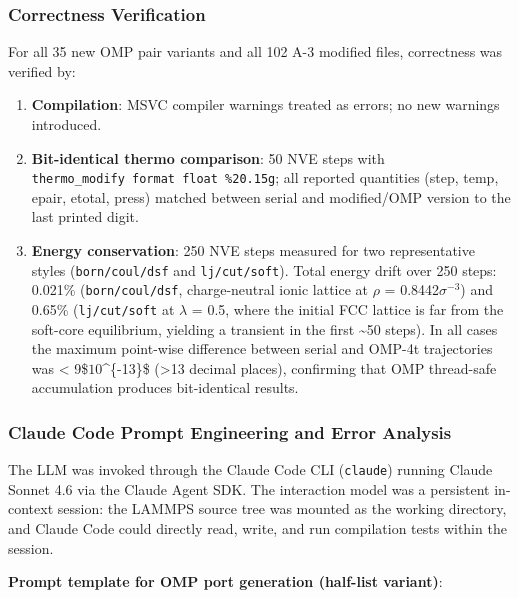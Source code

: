 \documentclass[
  11pt,
]{article}
\providecommand{\tightlist}{%
  \setlength{\itemsep}{0pt}\setlength{\parskip}{0pt}}
\begin{document}
\subsubsection{Correctness Verification}\label{correctness-verification}

For all 35 new OMP pair variants and all 102 A-3 modified files,
correctness was verified by:

\begin{enumerate}
\def\labelenumi{\arabic{enumi}.}
\tightlist
\item
  \textbf{Compilation}: MSVC compiler warnings treated as errors; no new
  warnings introduced.
\item
  \textbf{Bit-identical thermo comparison}: 50 NVE steps with
  \texttt{thermo\_modify\ format\ float\ \%20.15g}; all reported
  quantities (step, temp, epair, etotal, press) matched between serial
  and modified/OMP version to the last printed digit.
\item
  \textbf{Energy conservation}: 250 NVE steps measured for two
  representative styles (\texttt{born/coul/dsf} and
  \texttt{lj/cut/soft}). Total energy drift over 250 steps: 0.021\%
  (\texttt{born/coul/dsf}, charge-neutral ionic lattice at \(\rho\) =
  0.8442\(\sigma\)\(^{-3}\)) and 0.65\% (\texttt{lj/cut/soft} at
  \(\lambda\) = 0.5, where the initial FCC lattice is far from the
  soft-core equilibrium, yielding a transient in the first
  \textasciitilde50 steps). In all cases the maximum point-wise
  difference between serial and OMP-4t trajectories was \textless{}
  9\$\times\(10\)\^{}\{-13\}\$ (\textgreater13 decimal places),
  confirming that OMP thread-safe accumulation produces bit-identical
  results.
\end{enumerate}

\subsubsection{Claude Code Prompt Engineering and Error
Analysis}\label{claude-code-prompt-engineering-and-error-analysis}

The LLM was invoked through the Claude Code CLI (\texttt{claude})
running Claude Sonnet 4.6 via the Claude Agent SDK. The interaction
model was a persistent in-context session: the LAMMPS source tree was
mounted as the working directory, and Claude Code could directly read,
write, and run compilation tests within the session.

\textbf{Prompt template for OMP port generation (half-list variant)}:
\end{document}
